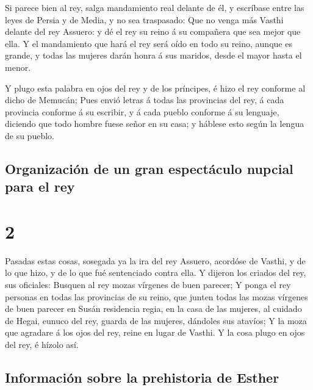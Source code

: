  Si parece bien al rey, salga mandamiento real delante de
él, y escríbase entre las leyes de Persia y de Media, y no sea
traspasado: Que no venga más Vasthi delante del rey Assuero: y dé el rey
su reino á su compañera que sea mejor que ella.  Y el
mandamiento que hará el rey será oído en todo su reino, aunque es
grande, y todas las mujeres darán honra á sus maridos, desde el mayor
hasta el menor.

 Y plugo esta palabra en ojos del rey y de los príncipes,
é hizo el rey conforme al dicho de Memucán;  Pues envió
letras á todas las provincias del rey, á cada provincia conforme á su
escribir, y á cada pueblo conforme á su lenguaje, diciendo que todo
hombre fuese señor en su casa; y háblese esto según la lengua de su
pueblo.

\hypertarget{organizaciuxf3n-de-un-gran-espectuxe1culo-nupcial-para-el-rey}{%
\subsection{Organización de un gran espectáculo nupcial para el
rey}\label{organizaciuxf3n-de-un-gran-espectuxe1culo-nupcial-para-el-rey}}

\hypertarget{section-1}{%
\section{2}\label{section-1}}

 Pasadas estas cosas, sosegada ya la ira del rey Assuero,
acordóse de Vasthi, y de lo que hizo, y de lo que fué sentenciado contra
ella.  Y dijeron los criados del rey, sus oficiales:
Busquen al rey mozas vírgenes de buen parecer;  Y ponga el
rey personas en todas las provincias de su reino, que junten todas las
mozas vírgenes de buen parecer en Susán residencia regia, en la casa de
las mujeres, al cuidado de Hegai, eunuco del rey, guarda de las mujeres,
dándoles sus atavíos;  Y la moza que agradare á los ojos
del rey, reine en lugar de Vasthi. Y la cosa plugo en ojos del rey, é
hízolo así.

\hypertarget{informaciuxf3n-sobre-la-prehistoria-de-esther}{%
\subsection{Información sobre la prehistoria de
Esther}\label{informaciuxf3n-sobre-la-prehistoria-de-esther}}

